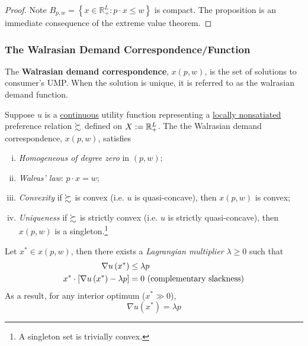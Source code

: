\documentclass{article}
\begin{document}
 			\begin{proof}
 				Note $B_{p, w}=\left\{x \in \mathbb{R}_{+}^{L} : p \cdot x \leq w\right\}$ is compact. The proposition is an immediate consequence of the extreme value theorem.
 			\end{proof}
 			
 			\subsubsection{The Walrasian Demand Correspondence/Function}
 			
 			\begin{definition}
 				The \textbf{Walrasian demand correspondence}, $x(p, w)$, is the set of solutions to consumer's UMP. When the solution is unique, it is referred to as the walrasian demand function.
 			\end{definition}
 			
 			\begin{proposition}[3.D.2]
 				Suppose $u$ is a \ul{continuous} utility function representing a \ul{locally nonsatiated} preference relation $\succsim$ defined on $X := \mathbb{R}^L_+$. The the Walrasian demand correspondence, $x(p,w)$, satisfies
 				\begin{enumerate}[(i)]
 					\item \emph{Homogeneous of degree zero} in $(p, w)$;
 					\item \emph{Walras' law}: $p \cdot x = w$;
 					\item \emph{Convexity} if $\succsim$ is convex (i.e. $u$ is quasi-concave), then $x(p,w)$ is convex;
 					\item \emph{Uniqueness} if $\succsim$ is strictly convex (i.e. $u$ is strictly quasi-concave), then $x(p,w)$ is a singleton.\footnote{A singleton set is trivially convex.}
 				\end{enumerate}
 			\end{proposition}
 			
 			\begin{proposition}
 				Let $x^* \in x(p, w)$, then there exists a \emph{Lagrangian multiplier} $\lambda \geq 0$ such that
 				\begin{align}
 					\nabla u\left(x^{*}\right) &\leq \lambda p \\
 					x^{*} \cdot\left[\nabla u\left(x^{*}\right)-\lambda p\right]&=0 \text{{ (complementary slackness)}}
 				\end{align}
 				As a result, for any interior optimum ($x^* \gg 0$), 
 				\begin{equation}
 					\nabla u\left(x^{*}\right)=\lambda p
 				\end{equation}
 			\end{proposition}
 			
\end{document}
